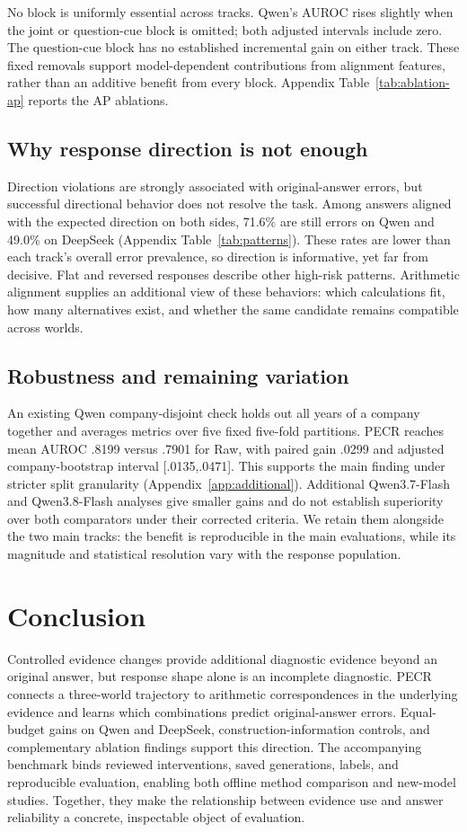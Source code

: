 No block is uniformly essential across tracks. Qwen's AUROC rises slightly when the joint or question-cue block is omitted; both adjusted intervals include zero. The question-cue block has no established incremental gain on either track. These fixed removals support model-dependent contributions from alignment features, rather than an additive benefit from every block. Appendix Table~\ref{tab:ablation-ap} reports the AP ablations.

\subsection{Why response direction is not enough}
Direction violations are strongly associated with original-answer errors, but successful directional behavior does not resolve the task. Among answers aligned with the expected direction on both sides, 71.6\% are still errors on Qwen and 49.0\% on DeepSeek (Appendix Table~\ref{tab:patterns}). These rates are lower than each track's overall error prevalence, so direction is informative, yet far from decisive. Flat and reversed responses describe other high-risk patterns. Arithmetic alignment supplies an additional view of these behaviors: which calculations fit, how many alternatives exist, and whether the same candidate remains compatible across worlds.

\subsection{Robustness and remaining variation}
An existing Qwen company-disjoint check holds out all years of a company together and averages metrics over five fixed five-fold partitions. PECR reaches mean AUROC .8199 versus .7901 for Raw, with paired gain .0299 and adjusted company-bootstrap interval [.0135,.0471]. This supports the main finding under stricter split granularity (Appendix~\ref{app:additional}). Additional Qwen3.7-Flash and Qwen3.8-Flash analyses give smaller gains and do not establish superiority over both comparators under their corrected criteria. We retain them alongside the two main tracks: the benefit is reproducible in the main evaluations, while its magnitude and statistical resolution vary with the response population.

\section{Conclusion}
Controlled evidence changes provide additional diagnostic evidence beyond an original answer, but response shape alone is an incomplete diagnostic. PECR connects a three-world trajectory to arithmetic correspondences in the underlying evidence and learns which combinations predict original-answer errors. Equal-budget gains on Qwen and DeepSeek, construction-information controls, and complementary ablation findings support this direction. The accompanying benchmark binds reviewed interventions, saved generations, labels, and reproducible evaluation, enabling both offline method comparison and new-model studies. Together, they make the relationship between evidence use and answer reliability a concrete, inspectable object of evaluation.

